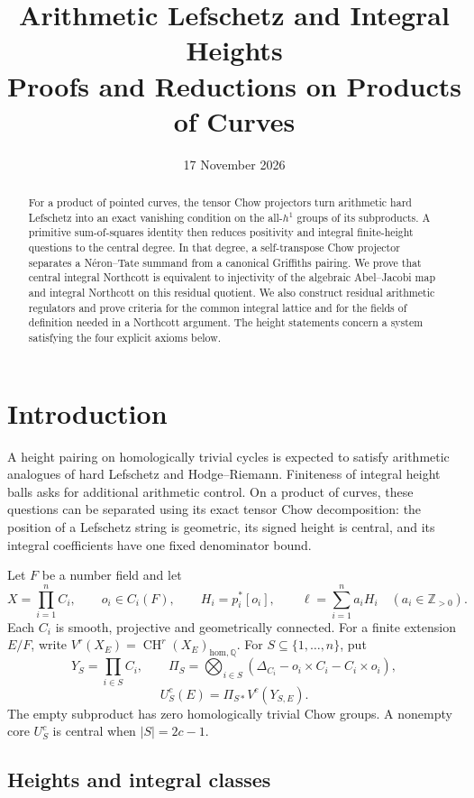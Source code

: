 \documentclass[11pt,a4paper]{article}
\title{Arithmetic Lefschetz and Integral Heights\\
Proofs and Reductions on Products of Curves}
\author{}
\date{17 November 2026}
\theoremstyle{definition}
\newcommand{\Q}{\mathbb Q}\newcommand{\R}{\mathbb R}\newcommand{\C}{\mathbb C}
\newcommand{\Z}{\mathbb Z}\newcommand{\A}{\mathbb A}\newcommand{\Fbar}{\overline F}
\newcommand{\CH}{\operatorname{CH}}\newcommand{\Pic}{\operatorname{Pic}}
\newcommand{\homol}{\mathrm{hom}}\newcommand{\alg}{\mathrm{alg}}
\numberwithin{equation}{section}
\begin{document}
\maketitle
\begin{abstract}
For a product of pointed curves, the tensor Chow projectors turn
arithmetic hard Lefschetz into an exact vanishing condition on the
all-\(h^1\) groups of its subproducts. A primitive sum-of-squares
identity then reduces positivity and integral finite-height
questions to the central degree. In that degree, a self-transpose
Chow projector separates a Néron--Tate summand from a canonical
Griffiths pairing. We prove that central integral Northcott is
equivalent to injectivity of the algebraic Abel--Jacobi map and
integral Northcott on this residual quotient. We also construct
residual arithmetic regulators and prove criteria for the common
integral lattice and for the fields of definition needed in a
Northcott argument. The height statements concern a system satisfying
the four explicit axioms below.
\end{abstract}
{\hypersetup{linkcolor=MathSectionLink}\tableofcontents}

\section{Introduction}\label{sec:introduction}

A height pairing on homologically trivial cycles is expected to
satisfy arithmetic analogues of hard Lefschetz and Hodge--Riemann.
Finiteness of integral height balls asks for additional arithmetic
control. On a product of curves, these questions can be separated
using its exact tensor Chow decomposition: the position of a
Lefschetz string is geometric, its signed height is central, and its
integral coefficients have one fixed denominator bound.

Let \(F\) be a number field and let
\[
 X=\prod_{i=1}^n C_i,\qquad o_i\in C_i(F),\qquad
 H_i=p_i^*[o_i],\qquad \ell=\sum_{i=1}^n a_iH_i
 \quad(a_i\in\Z_{>0}).
\]
Each \(C_i\) is smooth, projective and geometrically connected.
For a finite extension \(E/F\), write
\(V^r(X_E)=\CH^r(X_E)_{\homol,\Q}\).
For \(S\subseteq\{1,\ldots,n\}\), put
\[
 Y_S=\prod_{i\in S}C_i,\qquad
 \Pi_S=\bigotimes_{i\in S}
  (\Delta_{C_i}-o_i\times C_i-C_i\times o_i),
\]
\[
 U_S^c(E)=\Pi_{S*}V^c(Y_{S,E}).
\]
The empty subproduct has zero homologically trivial Chow groups.
A nonempty core \(U_S^c\) is central when \(|S|=2c-1\).

\subsection{Heights and integral classes}\label{sec:height-data}
\end{document}
